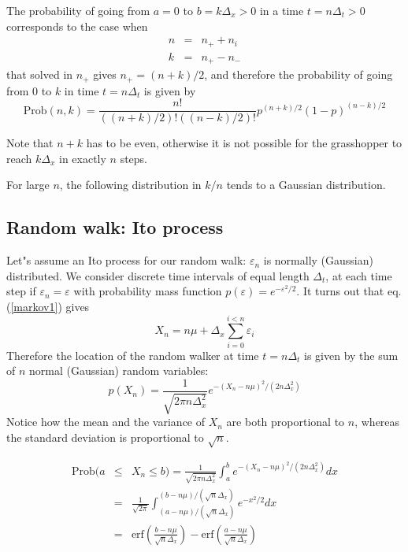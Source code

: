 \documentclass[justified, sixbynine]{tufte-book}
\theoremstyle{plain}%
\newtheorem * {corollary}{Corollary}
\theoremstyle{definition}
\theoremstyle{remark}
\newtheorem * {remark}{Remark}
\newtheorem * {note}{Note}
\begin{document}
\begin{fullwidth}
The probability of going from $a=0$ to $b=k\Delta _x>0$ in a time $t=n\Delta
_t>0$ corresponds to the case when
\begin{eqnarray}
n &=&n_{+}+n_i \\
k &=&n_{+}-n_{-}
\end{eqnarray}
that solved in $n_{+}$ gives $n_{+}=(n+k)/2$, and therefore the probability
of going from $0$ to $k$ in time $t=n\Delta _t$ is given by
\begin{equation}
\textrm{Prob}(n, k)=\frac{n!}{((n+k)/2)!((n-k)/2)!}p^{(n+k)/2}(1-p)^{(n-k)/2}
\end{equation}

Note that $n+k$ has to be even, otherwise it is not possible for the
grasshopper to reach $k\Delta _x$ in exactly $n$ steps.

For large $n$, the following distribution in $k/n$ tends to a Gaussian distribution.

\goodbreak\subsection{Random walk: Ito process}

Let"s assume an Ito process for our random walk: $\varepsilon _n$ is normally
(Gaussian) distributed. We consider discrete time intervals of equal length $%
\Delta _t$, at each time step if $\varepsilon _n=\varepsilon $ with
probability mass function $p(\varepsilon )=e^{-\varepsilon ^2/2}$. It turns
out that eq.(\ref{markov1}) gives
\begin{equation}
X_n = n \mu + \Delta _x\sum_{i=0}^{i<n}\varepsilon _i
\end{equation}
Therefore the location of the random walker at time $t=n\Delta _t$ is given
by the sum of $n$ normal (Gaussian) random variables:
\begin{equation}
p(X_n)=\frac 1{\sqrt{2\pi n\Delta _x^2}}e^{-(X_n - n\mu)^2/(2n\Delta _x^2)}
\end{equation}
Notice how the mean and the variance of $X_n$ are both proportional
to $n$, whereas the standard deviation is proportional to $\sqrt{n}$.

\begin{eqnarray}
\textrm{Prob}(a &\leq &X_n\leq b)=\frac 1{\sqrt{2\pi n\Delta _x^2}}\int_a^be^{-(X_n - n\mu)^2/(2n%
\Delta _x^2)}dx \\
&=&\frac 1{\sqrt{2\pi }}\int_{(a-n\mu)/(\sqrt{n}\Delta _x)}^{(b-n\mu)/(\sqrt{n}\Delta
_x)}e^{-x^2/2}dx \\
&=&\textrm{erf}(\frac {b-n\mu}{\sqrt{n}\Delta _x})-\textrm{erf}(\frac {a-n\mu}{\sqrt{n}\Delta
_x})
\end{eqnarray}


\end{fullwidth}
\end{document}
